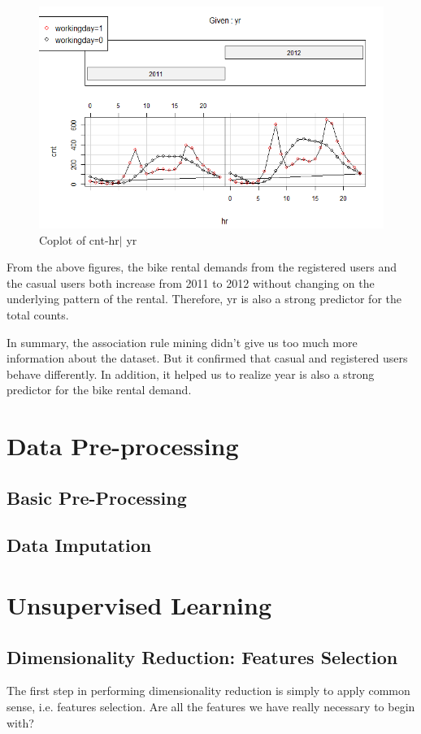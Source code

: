 \documentclass[12pt]{article}
\begin{document}
		\begin{figure}[H]
			\centering
			\includegraphics[width=\linewidth]{figures/cnt_year.png}
			\caption{Coplot of cnt-hr$|$ yr}
		\end{figure}
    From the above figures, the bike rental demands from the registered users and the casual users both increase from 2011 to 2012 without changing on the underlying pattern of the rental. Therefore, yr is also a strong predictor for the total counts.
    
    In summary, the association rule mining didn't give us too much more information about the dataset. But it confirmed that casual and registered users behave differently. In addition, it helped us to realize year is also a strong predictor for the bike rental demand. 
    
    \section{Data Pre-processing}
    \subsection{Basic Pre-Processing}
    \subsection{Data Imputation}
    
	\section{Unsupervised Learning}
	\subsection{Dimensionality Reduction: Features Selection}
	The first step in performing dimensionality reduction is simply to apply common sense, i.e. features selection. Are all the features we have really necessary to begin with?
	
\end{document}
